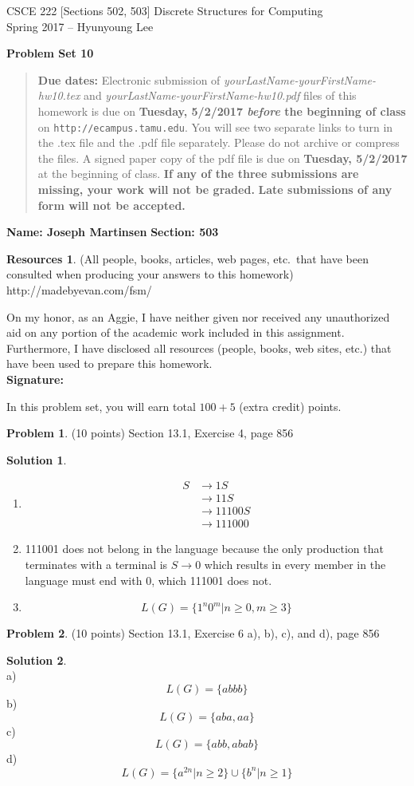 \documentclass{article}
\theoremstyle{definition}
\newtheorem{problem}{Problem}
\newtheorem*{solution}{Solution}
\newtheorem*{resources}{Resources}
\newcommand{\name}[2]{\noindent\textbf{Name: #1}\hfill \textbf{Section: #2}}
\newcommand{\honor}{\noindent On my honor, as an Aggie, I have neither
  given nor received any unauthorized aid on any portion of the
  academic work included in this assignment. Furthermore, I have
  disclosed all resources (people, books, web sites, etc.) that have
  been used to prepare this homework. \\[2ex]
 \textbf{Signature:} \underline{\hspace*{10cm}} }
\newcommand{\problemset}[1]{\begin{center}\textbf{Problem Set #1}\end{center}}
\newcommand{\duedate}[2]{\begin{quote}\textbf{Due dates:} Electronic
    submission of \textsl{yourLastName-yourFirstName-hw10.tex} and 
    \textsl{yourLastName-yourFirstName-hw10.pdf} files of this homework is due on
    \textbf{#1} on \texttt{http://ecampus.tamu.edu}. You will see two separate links
    to turn in the .tex file and the .pdf file separately. Please do not archive or compress the files.  
    A signed paper copy of the pdf file is due on \textbf{#2} at the beginning of class.
    \textbf{If any of the three submissions are missing, your work will not be graded.}
    \textbf{Late submissions of any form will not be accepted.}\end{quote} }
\begin{document}
\vspace*{-18mm}
\begin{center}
{\large
CSCE 222 [Sections 502, 503] Discrete Structures for Computing\\[.5ex]
Spring 2017 -- Hyunyoung Lee\\}
\end{center}
\problemset{10}
\duedate{Tuesday, 5/2/2017 \textit{before} the beginning of class}{Tuesday, 5/2/2017}
\name{ Joseph Martinsen }{503}
\begin{resources} (All people, books, articles, web pages, etc.\ that
  have been consulted when producing your answers to this homework) \\
  http://madebyevan.com/fsm/
\end{resources}
\honor

\bigskip

\noindent
In this problem set, you will earn total $100+5$ (extra credit) points.

\begin{problem} (10 points)
Section 13.1, Exercise 4, page 856
\end{problem}
\begin{solution} \ \\
  \begin{enumerate}
    \item 
      \begin{align*}
        S &\rightarrow 1S \\
        &\rightarrow 11S \\
        &\rightarrow 11100S \\
        &\rightarrow 111000
      \end{align*}
      
      \item
      111001 does not belong in the language because the only production that
      terminates with a terminal is $S \rightarrow 0$ which results in every member
      in the language must end with 0, which 111001 does not.
      
      \item
      $$L(G) = \{ 1^n 0^m \vert n\ge 0, m \ge 3 \} $$
  \end{enumerate}
\end{solution}

\begin{problem} (10 points)
Section 13.1, Exercise 6 a), b), c), and d), page 856
\end{problem}
\begin{solution} \ \\
a) \\
$$L(G) = \{ abbb \}$$
b) \\
$$L(G) = \{aba, aa \} $$
c) \\
$$L(G) = \{abb, abab \} $$
d) \\
$$L(G) = \{a^{2n} \vert n \ge 2 \} \cup \{b^n \vert n \ge 1 \} $$
\end{solution}
\end{document}
